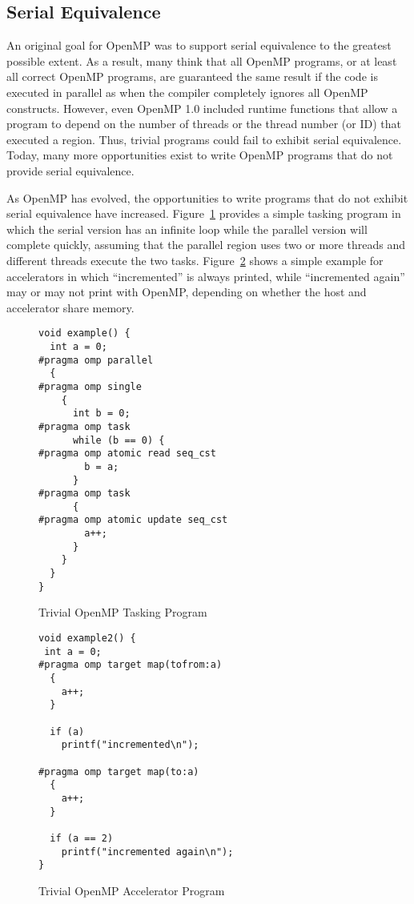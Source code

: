 \subsection{Serial Equivalence}
\label{sub:serial_equivalence}

An original goal for OpenMP was to support serial equivalence to the 
greatest possible extent. As a result, many think that all OpenMP programs, 
or at least all correct OpenMP programs, are guaranteed the same result
if the code is executed in parallel as when the compiler completely 
ignores all OpenMP constructs. However, even OpenMP 1.0 included runtime
functions that allow a program to depend on the number of threads or the
thread number (or ID) that executed a region. Thus, trivial programs could
fail to exhibit serial equivalence. Today, many more opportunities exist
to write OpenMP programs that do not provide serial equivalence. 

As OpenMP has evolved, the opportunities to write programs that do not
exhibit serial equivalence have increased. Figure~\ref{fig:trivial_task} 
provides a simple tasking program in which the serial version has an infinite 
loop while the parallel version will complete quickly, assuming that the 
parallel region uses two or more threads and different threads execute the 
two tasks. Figure~\ref{fig:trivial_target} shows a simple example for 
accelerators in which ``incremented'' is always printed, while 
``incremented again'' may or may not print with OpenMP, depending on 
whether the host and accelerator share memory. 

\begin{figure}
\begin{verbatim}
void example() {
  int a = 0;
#pragma omp parallel
  {
#pragma omp single
    {
      int b = 0;
#pragma omp task
      while (b == 0) {
#pragma omp atomic read seq_cst
        b = a;
      }
#pragma omp task
      {
#pragma omp atomic update seq_cst
        a++;
      }
    }
  }
}
\end{verbatim}
\caption{Trivial OpenMP Tasking Program\label{fig:trivial_task}}
\end{figure}

\begin{figure}
\begin{verbatim}
void example2() {
 int a = 0;
#pragma omp target map(tofrom:a)
  {
    a++;
  }

  if (a)
    printf("incremented\n");
  
#pragma omp target map(to:a)
  {
    a++;
  }

  if (a == 2)
    printf("incremented again\n");
}
\end{verbatim}
\caption{Trivial OpenMP Accelerator Program\label{fig:trivial_target}}
\end{figure}


